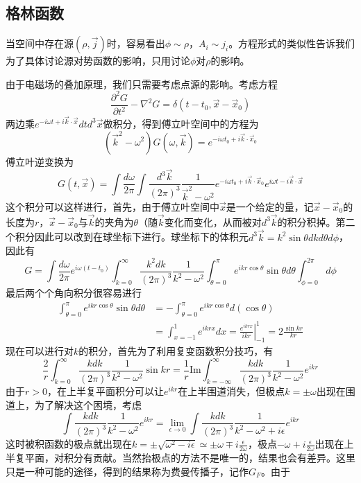 \documentclass[a4paper,11pt]{ctexbook}
\newcommand{\beq}{\begin{equation}}
\newcommand{\eeq}{\end{equation}}
\newcommand{\bea}{\begin{equation}\begin{aligned}}
\newcommand{\eea}{\end{aligned}\end{equation}}
\begin{document}
\subsection{格林函数}
当空间中存在源$(\rho,\vec{j})$时，容易看出$\phi \sim \rho$，$A_i \sim j_i$。方程形式的类似性告诉我们为了具体讨论源对势函数的影响，只用讨论$\phi$对$\rho$的影响。
\par
由于电磁场的叠加原理，我们只需要考虑点源的影响。考虑方程
\beq
\frac{\partial^2 G}{\partial t^2} - \nabla^2 G= \delta(t-t_0,\vec{x}-\vec{x}_0)
\eeq
两边乘$e^{-i\omega t + i \vec{k} \cdot \vec{x}} dt d^3 \vec{x}$做积分，得到傅立叶空间中的方程为
\beq
(\vec{k}^2 - \omega^2 ) G(\omega,\vec k)= e^{-i\omega t_0 + i \vec{k} \cdot \vec{x}_0}
\eeq
傅立叶逆变换为
\beq
G(t,\vec x) = \int \frac{d\omega}{2\pi} \int \frac{d^3 \vec{k}}{(2\pi)^3} \frac{1}{\vec{k}^2-\omega^2} e^{-i\omega t_0 + i \vec{k} \cdot \vec{x}_0} e^{i\omega t - i \vec{k} \cdot \vec{x}}
\eeq
这个积分可以这样进行，首先，由于傅立叶空间中$\vec{x}$是一个给定的量，记$\vec{x}-\vec{x}_0$的长度为$r$，$\vec{x}-\vec{x}_0$与$\vec{k}$的夹角为$\theta$（随$\vec{k}$变化而变化，从而被对$d^3 \vec{k}$的积分积掉。第二个积分因此可以改到在球坐标下进行。球坐标下的体积元$d^3 \vec{k} = k^2 \sin \theta dk d\theta d\phi$，因此有
\beq
G = \int \frac{d\omega}{2\pi} e^{i\omega ( t - t_0)}  \int_{k=0}^\infty \frac{k^2 dk}{(2\pi)^3} \frac{1}{k^2 - \omega^2} \int_{\theta = 0}^\pi e^{ikr\cos \theta } \sin \theta d\theta \int_{\phi = 0}^{2\pi}d\phi
\eeq
最后两个个角向积分很容易进行
\bea
\int_{\theta = 0}^\pi e^{ikr \cos \theta} \sin \theta d\theta &= -\int_{\theta = 0}^{\pi} e^{ikr \cos \theta} d(\cos \theta) \\
&= \int_{x = -1}^1 e^{ikrx}dx = \left. \frac{e^{ikrx}}{ikr} \right|_{-1}^1 = 2\frac{\sin kr}{kr}
\eea
现在可以进行对$k$的积分，首先为了利用复变函数积分技巧，有
\beq
\frac{2}{r} \int_{k=0}^\infty \frac{k dk}{(2\pi)^3} \frac{1}{k^2 - \omega^2}\sin kr = \frac{1}{r} \mathrm{Im} \int_{k=-\infty}^\infty \frac{k dk}{(2\pi)^3} \frac{1}{k^2 - \omega^2} e^{ikr} 
\eeq
由于$r>0$，在上半复平面积分可以让$e^{ikr}$在上半围道消失，但极点$k = \pm \omega$出现在围道上，为了解决这个困境，考虑
\beq
\int \frac{k dk}{(2\pi)^3} \frac{1}{k^2 - \omega^2} e^{ikr}  = \lim_{\epsilon \to 0} \int \frac{k dk}{(2\pi)^3} \frac{1}{k^2 - \omega^2 + i \epsilon} e^{ikr} 
\eeq
这时被积函数的极点就出现在$k = \pm \sqrt{\omega^2 - i\epsilon} \simeq \pm \omega \mp i\frac{\epsilon}{2\omega}$，极点$-\omega + i \frac{\epsilon}{2\omega} $出现在上半复平面，对积分有贡献。当然抬极点的方法不是唯一的，结果也会有差异。这里只是一种可能的途径，得到的结果称为费曼传播子，记作$G_F$。由于
\end{document}
